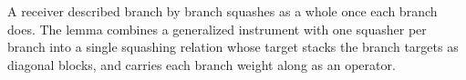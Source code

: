
A receiver described branch by branch squashes as a whole once each branch
does. The lemma combines a generalized instrument with one squasher per branch
into a single squashing relation whose target stacks the branch targets as
diagonal blocks, and carries each branch weight along as an operator.

